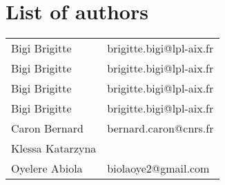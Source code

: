\documentclass[12pt,a4paper]{article}
\begin{document}
 
 \setcounter{page}{24} 
    \pagestyle{fancy} 
\section*{List of authors}
\begin{longtable}{p{8cm}p{8cm}}
Bigi Brigitte & brigitte.bigi@lpl-aix.fr \\ 
Bigi Brigitte & brigitte.bigi@lpl-aix.fr \\ 
Bigi Brigitte & brigitte.bigi@lpl-aix.fr \\ 
Bigi Brigitte & brigitte.bigi@lpl-aix.fr \\ 
Caron Bernard & bernard.caron@cnrs.fr \\ 
Klessa Katarzyna &  \\ 
Oyelere Abiola & biolaoye2@gmail.com \\ 
\end{longtable}
 
 
\end{document}
